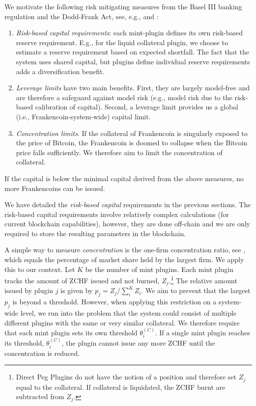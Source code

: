 \documentclass[english,11pt]{article}
\begin{document}
We motivate the following risk mitigating measures from 
the Basel III banking regulation and the Dodd-Frank Act, see, e.g., \cite{basel3}
and \cite{acharya2010regulating}:
\begin{enumerate}
\item \emph{Risk-based capital requirements}: each mint-plugin defines its own
	risk-based reserve requirement. E.g., for the liquid collateral
	plugin, we choose to estimate a reserve requirement based on expected shortfall.
	The fact that the system uses shared capital, but plugins define individual reserve requirements
	adds a diversification benefit.
\item \emph{Leverage limits} have two main benefits. First, 
    they are largely model-free and are therefore a safeguard against model risk 
    (e.g., model risk	due to the risk-based calibration of capital).	
	Second, a leverage limit provides us a global (i.e., Frankencoin-system-wide) capital limit.
\item \emph{Concentration limits}. If the collateral of Frankencoin
	is singularly exposed to the price of Bitcoin, the Frankencoin is doomed
	to collapse when the Bitcoin price falls sufficiently. We therefore aim
	to limit the concentration of collateral. 
\end{enumerate}

If the capital is below the minimal capital derived from the above measures,
no more Frankencoins can be issued.

We have detailed the \emph{risk-based capital} requirements in the previous sections.
The risk-based capital requirements involve relatively complex calculations
(for current blockchain capabilities), however, they are done off-chain and we are only required to store the resulting
parameters in the blockchain.

A simple way to measure \emph{concentration} is the one-firm concentration ratio,
see \cite{curry1983industrial}, which equals the percentage of market share held by the largest firm. We apply this to our context. Let $K$ be the number of mint plugins. Each mint plugin tracks the amount of ZCHF issued and not burned, $Z_j$.\footnote{Direct Peg Plugins
do not have the notion of a position and therefore set $Z_j$ equal to the
collateral. If collateral is liquidated, the ZCHF burnt are subtracted from
$Z_j$.}
The relative amount issued by plugin $j$ is given by $p_j=Z_j/\sum_i^K Z_i$. 
We aim to prevent that the largest $p_j$ is beyond a threshold. 
However, when applying this restriction on a system-wide level, we run into
the problem that the system could consist of multiple different plugins with
the same or very similar collateral. We therefore require that
each mint plugin sets its own threshold $\theta_i^{(C)}$. If a single mint plugin reaches its threshold,
$\theta_i^{(C)}$, the plugin cannot issue any more ZCHF until the concentration is reduced.
\end{document}
